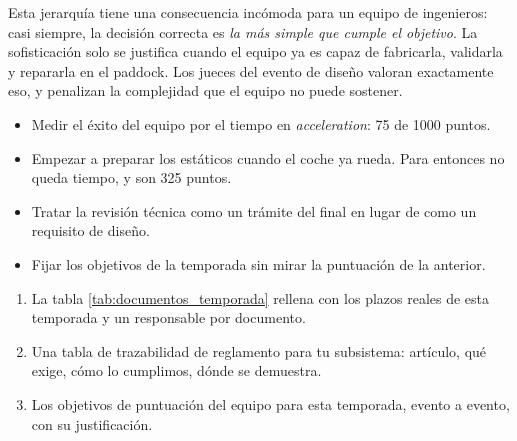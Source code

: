 Esta jerarquía tiene una consecuencia incómoda para un equipo de ingenieros: casi
siempre, la decisión correcta es \emph{la más simple que cumple el objetivo}. La
sofisticación solo se justifica cuando el equipo ya es capaz de fabricarla,
validarla y repararla en el paddock. Los jueces del evento de diseño valoran
exactamente eso, y penalizan la complejidad que el equipo no puede sostener.


\begin{caso}
\end{caso}

\begin{ojo}
\begin{itemize}
  \item Medir el éxito del equipo por el tiempo en \textit{acceleration}: 75 de
        1000 puntos.
  \item Empezar a preparar los estáticos cuando el coche ya rueda. Para entonces
        no queda tiempo, y son 325 puntos.
  \item Tratar la revisión técnica como un trámite del final en lugar de como un
        requisito de diseño.
  \item Fijar los objetivos de la temporada sin mirar la puntuación de la
        anterior.
\end{itemize}
\end{ojo}

\begin{entregable}
\begin{enumerate}
  \item La tabla \ref{tab:documentos_temporada} rellena con los plazos reales de
        esta temporada y un responsable por documento.
  \item Una tabla de trazabilidad de reglamento para tu subsistema: artículo,
        qué exige, cómo lo cumplimos, dónde se demuestra.
  \item Los objetivos de puntuación del equipo para esta temporada, evento a
        evento, con su justificación.
\end{enumerate}
\end{entregable}

